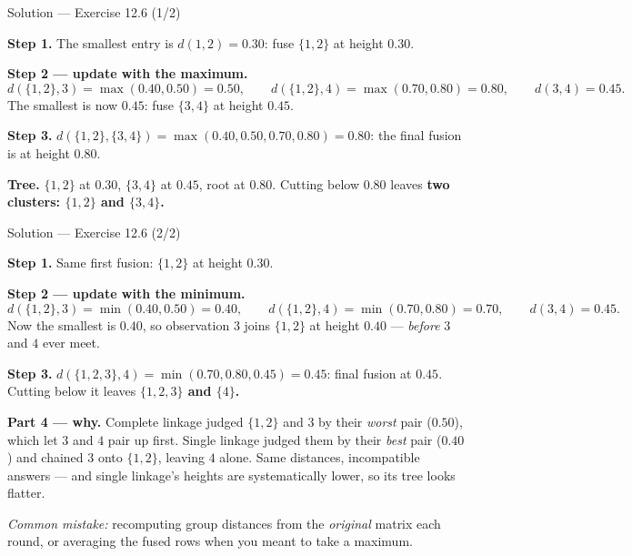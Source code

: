 \documentclass[aspectratio=169,11pt]{beamer}
\begin{document}
\begin{frame}{Solution --- Exercise 12.6 (1/2)}
\begin{solutionbox}
  \textbf{Step 1.} The smallest entry is $d(1,2)=0.30$: fuse $\{1,2\}$ at height
  $\mathbf{0.30}$.

  \medskip
  \textbf{Step 2 --- update with the maximum.}
  \[
    d(\{1,2\},3)=\max(0.40,0.50)=0.50,\qquad
    d(\{1,2\},4)=\max(0.70,0.80)=0.80,\qquad
    d(3,4)=0.45 .
  \]
  The smallest is now $0.45$: fuse $\{3,4\}$ at height $\mathbf{0.45}$.

  \medskip
  \textbf{Step 3.} $d(\{1,2\},\{3,4\})=\max(0.40,0.50,0.70,0.80)=0.80$: the final fusion
  is at height $\mathbf{0.80}$.

  \medskip
  \textbf{Tree.} $\{1,2\}$ at $0.30$, $\{3,4\}$ at $0.45$, root at $0.80$.
  Cutting below $0.80$ leaves \textbf{two clusters: $\{1,2\}$ and $\{3,4\}$.}
\end{solutionbox}
\end{frame}

\begin{frame}{Solution --- Exercise 12.6 (2/2)}
  \footnotesize
\begin{solutionbox}
  \textbf{Step 1.} Same first fusion: $\{1,2\}$ at height $\mathbf{0.30}$.

  \medskip
  \textbf{Step 2 --- update with the minimum.}
  \[
    d(\{1,2\},3)=\min(0.40,0.50)=0.40,\qquad
    d(\{1,2\},4)=\min(0.70,0.80)=0.70,\qquad
    d(3,4)=0.45 .
  \]
  Now the smallest is $0.40$, so observation $3$ joins $\{1,2\}$ at height $\mathbf{0.40}$
  --- \emph{before} $3$ and $4$ ever meet.

  \medskip
  \textbf{Step 3.} $d(\{1,2,3\},4)=\min(0.70,0.80,0.45)=0.45$: final fusion at
  $\mathbf{0.45}$. Cutting below it leaves \textbf{$\{1,2,3\}$ and $\{4\}$.}

  \medskip
  \textbf{Part 4 --- why.} Complete linkage judged $\{1,2\}$ and $3$ by their \emph{worst}
  pair ($0.50$), which let $3$ and $4$ pair up first. Single linkage judged them by their
  \emph{best} pair ($0.40$) and chained $3$ onto $\{1,2\}$, leaving $4$ alone. Same
  distances, incompatible answers --- and single linkage's heights are systematically lower,
  so its tree looks flatter.

  \smallskip
  \textit{Common mistake:} recomputing group distances from the \emph{original} matrix each
  round, or averaging the fused rows when you meant to take a maximum.
\end{solutionbox}
\end{frame}
\end{document}
